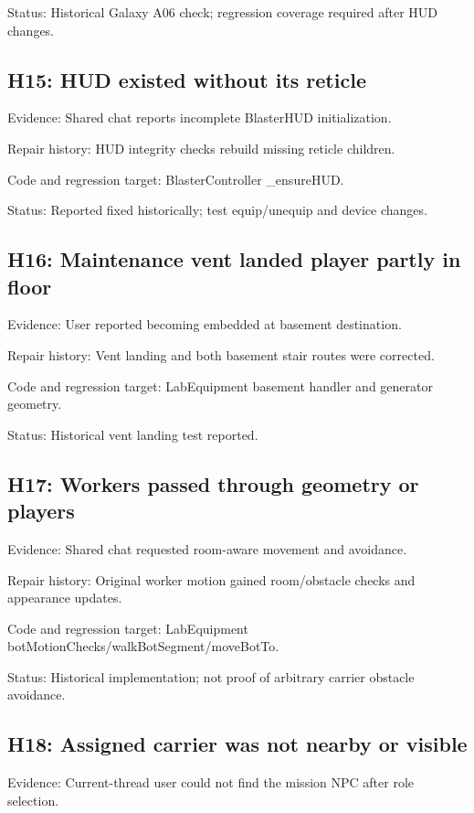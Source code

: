 Status: Historical Galaxy A06 check; regression coverage required after HUD changes.\allowbreak{}

\subsection{H15: HUD existed without its reticle}
Evidence: Shared chat reports incomplete BlasterHUD initialization.\allowbreak{}

Repair history: HUD integrity checks rebuild missing reticle children.\allowbreak{}

Code and regression target: BlasterController \_\allowbreak{}ensureHUD.\allowbreak{}

Status: Reported fixed historically; test equip/\allowbreak{}unequip and device changes.\allowbreak{}

\subsection{H16: Maintenance vent landed player partly in floor}
Evidence: User reported becoming embedded at basement destination.\allowbreak{}

Repair history: Vent landing and both basement stair routes were corrected.\allowbreak{}

Code and regression target: LabEquipment basement handler and generator geometry.\allowbreak{}

Status: Historical vent landing test reported.\allowbreak{}

\subsection{H17: Workers passed through geometry or players}
Evidence: Shared chat requested room-aware movement and avoidance.\allowbreak{}

Repair history: Original worker motion gained room/\allowbreak{}obstacle checks and appearance updates.\allowbreak{}

Code and regression target: LabEquipment botMotionChecks/\allowbreak{}walkBotSegment/\allowbreak{}moveBotTo.\allowbreak{}

Status: Historical implementation; not proof of arbitrary carrier obstacle avoidance.\allowbreak{}

\subsection{H18: Assigned carrier was not nearby or visible}
Evidence: Current-thread user could not find the mission NPC after role selection.\allowbreak{}

